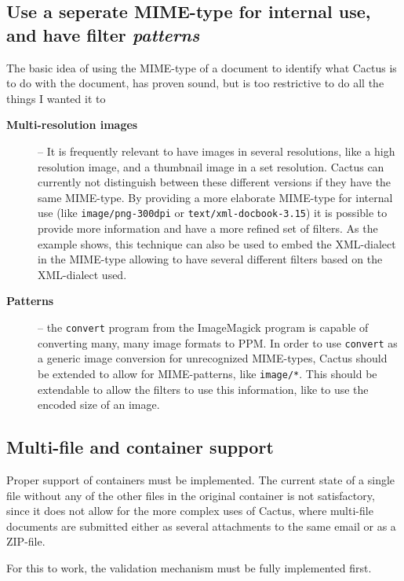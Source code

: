 \subsection*{Use a seperate MIME-type for internal use, and have
  filter \textit{patterns}}

The basic idea of using the MIME-type of a document to identify what
Cactus is to do with the document, has proven sound, but is too
restrictive to do all the things I wanted it to

\begin{description}
\item[\textbf{Multi-resolution images}] -- It is frequently relevant
  to have images in several resolutions, like a high resolution image,
  and a thumbnail image in a set resolution.  Cactus can currently not
  distinguish between these different versions if they have the same
  MIME-type.  By providing a more elaborate MIME-type for internal use
  (like \texttt{image/png-300dpi} or
  \texttt{text/xml-docbook-3.15}) it is possible to provide more
  information and have a more refined set of filters.  As the example
  shows, this technique can also be used to embed the XML-dialect in
  the MIME-type allowing to have several different filters based on
  the XML-dialect used.

\item[\textbf{Patterns}] -- the \texttt{convert} program from the
ImageMagick program is capable of converting many, many image formats
to PPM.  In order to use \texttt{convert} as a generic image
conversion for unrecognized MIME-types, Cactus should be extended to
allow for MIME-patterns, like \texttt{image/*}.  This should be
extendable to allow the filters to use this information, like to use
the encoded size of an image.

\end{description}


\subsection*{Multi-file and container support}

Proper support of containers must be implemented.  The current state
of a single file without any of the other files in the original
container is not satisfactory, since it does not allow for the more
complex uses of Cactus, where multi-file documents are submitted
either as several attachments to the same email or as a ZIP-file.

For this to work, the validation mechanism must be fully implemented
first.

